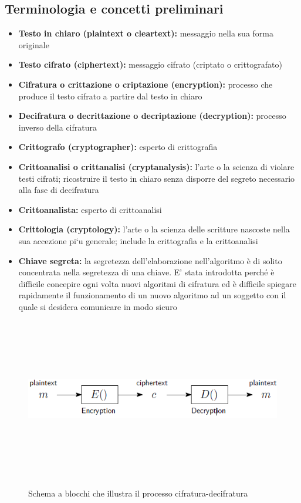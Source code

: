 \subsection{Terminologia e concetti preliminari}
\begin{itemize} 
  \item \textbf{Testo in chiaro (plaintext o cleartext):} messaggio nella sua forma originale
  \item \textbf{Testo cifrato (ciphertext):} messaggio cifrato (criptato o crittografato)
  \item \textbf{Cifratura o crittazione o criptazione (encryption):} processo che produce il testo cifrato a partire dal testo in chiaro
  \item \textbf{Decifratura o decrittazione o decriptazione (decryption):} processo inverso della cifratura
  \item \textbf{Crittografo (cryptographer):} esperto di crittografia
  \item \textbf{Crittoanalisi o crittanalisi (cryptanalysis):} l’arte o la scienza di violare testi cifrati; ricostruire il testo in chiaro senza disporre del segreto necessario alla fase di decifratura
  \item \textbf{Crittoanalista:} esperto di crittoanalisi
  \item \textbf{Crittologia (cryptology):} l’arte o la scienza delle scritture nascoste nella sua accezione pi`u generale; include la crittografia e la crittoanalisi
  \item \textbf{Chiave segreta:} la segretezza dell'elaborazione nell'algoritmo è di solito concentrata nella segretezza di una chiave. E' stata introdotta perché è difficile concepire ogni volta nuovi algoritmi di cifratura ed è difficile spiegare rapidamente il funzionamento di un nuovo    algoritmo ad un soggetto con il quale si desidera comunicare in modo sicuro
\end{itemize}
\begin{figure}[htbp]
	\centering%
	\subfigure%
	{\includegraphics[height=7cm, width=12cm, keepaspectratio]{Immagini/introduzione/schema_blocchi_crittografia.png}}
	\caption{Schema a blocchi che illustra il processo cifratura-decifratura \label{fig:schema_blocchi_crittografia}} 	
\end{figure}

